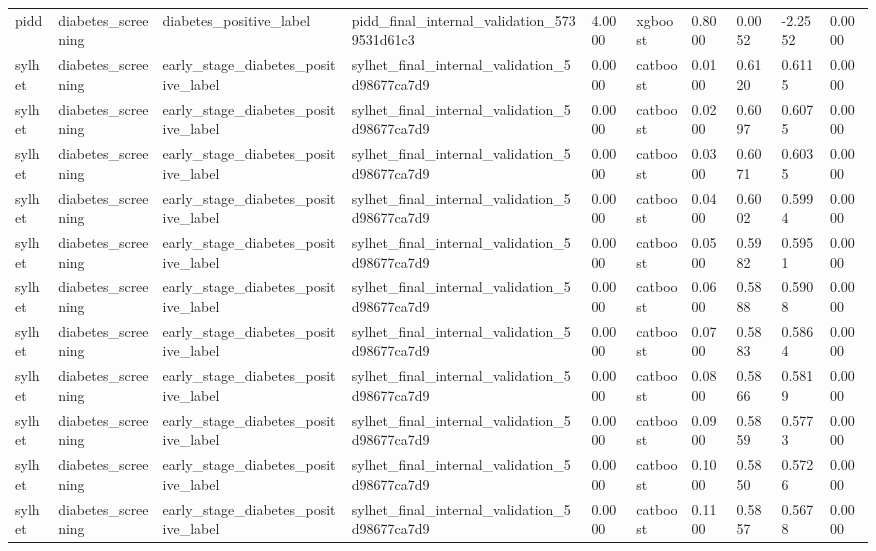 \begin{tabular}{llllllllll}
pidd & diabetes\_screening & diabetes\_positive\_label & pidd\_final\_internal\_validation\_5739531d61c3 & 4.0000 & xgboost & 0.8000 & 0.0052 & -2.2552 & 0.0000 \\
sylhet & diabetes\_screening & early\_stage\_diabetes\_positive\_label & sylhet\_final\_internal\_validation\_5d98677ca7d9 & 0.0000 & catboost & 0.0100 & 0.6120 & 0.6115 & 0.0000 \\
sylhet & diabetes\_screening & early\_stage\_diabetes\_positive\_label & sylhet\_final\_internal\_validation\_5d98677ca7d9 & 0.0000 & catboost & 0.0200 & 0.6097 & 0.6075 & 0.0000 \\
sylhet & diabetes\_screening & early\_stage\_diabetes\_positive\_label & sylhet\_final\_internal\_validation\_5d98677ca7d9 & 0.0000 & catboost & 0.0300 & 0.6071 & 0.6035 & 0.0000 \\
sylhet & diabetes\_screening & early\_stage\_diabetes\_positive\_label & sylhet\_final\_internal\_validation\_5d98677ca7d9 & 0.0000 & catboost & 0.0400 & 0.6002 & 0.5994 & 0.0000 \\
sylhet & diabetes\_screening & early\_stage\_diabetes\_positive\_label & sylhet\_final\_internal\_validation\_5d98677ca7d9 & 0.0000 & catboost & 0.0500 & 0.5982 & 0.5951 & 0.0000 \\
sylhet & diabetes\_screening & early\_stage\_diabetes\_positive\_label & sylhet\_final\_internal\_validation\_5d98677ca7d9 & 0.0000 & catboost & 0.0600 & 0.5888 & 0.5908 & 0.0000 \\
sylhet & diabetes\_screening & early\_stage\_diabetes\_positive\_label & sylhet\_final\_internal\_validation\_5d98677ca7d9 & 0.0000 & catboost & 0.0700 & 0.5883 & 0.5864 & 0.0000 \\
sylhet & diabetes\_screening & early\_stage\_diabetes\_positive\_label & sylhet\_final\_internal\_validation\_5d98677ca7d9 & 0.0000 & catboost & 0.0800 & 0.5866 & 0.5819 & 0.0000 \\
sylhet & diabetes\_screening & early\_stage\_diabetes\_positive\_label & sylhet\_final\_internal\_validation\_5d98677ca7d9 & 0.0000 & catboost & 0.0900 & 0.5859 & 0.5773 & 0.0000 \\
sylhet & diabetes\_screening & early\_stage\_diabetes\_positive\_label & sylhet\_final\_internal\_validation\_5d98677ca7d9 & 0.0000 & catboost & 0.1000 & 0.5850 & 0.5726 & 0.0000 \\
sylhet & diabetes\_screening & early\_stage\_diabetes\_positive\_label & sylhet\_final\_internal\_validation\_5d98677ca7d9 & 0.0000 & catboost & 0.1100 & 0.5857 & 0.5678 & 0.0000 \\

\end{tabular}

